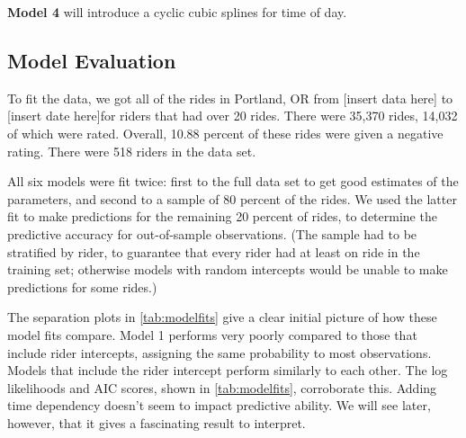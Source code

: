 \documentclass[]{article}
\begin{document}
\textbf{Model 4} will introduce a cyclic cubic splines for time of day.

\subsection{Model Evaluation}\label{model-evaluation}

To fit the data, we got all of the rides in Portland, OR from {[}insert
data here{]} to {[}insert date here{]}for riders that had over 20 rides.
There were 35,370 rides, 14,032 of which were rated. Overall, 10.88
percent of these rides were given a negative rating. There were 518
riders in the data set.

All six models were fit twice: first to the full data set to get good
estimates of the parameters, and second to a sample of 80 percent of the
rides. We used the latter fit to make predictions for the remaining 20
percent of rides, to determine the predictive accuracy for out-of-sample
observations. (The sample had to be stratified by rider, to guarantee
that every rider had at least on ride in the training set; otherwise
models with random intercepts would be unable to make predictions for
some rides.)

The separation plots in \autoref{tab:modelfits} give a clear initial
picture of how these model fits compare. Model 1 performs very poorly
compared to those that include rider intercepts, assigning the same
probability to most observations. Models that include the rider
intercept perform similarly to each other. The log likelihoods and AIC
scores, shown in \autoref{tab:modelfits}, corroborate this. Adding time
dependency doesn't seem to impact predictive ability. We will see later,
however, that it gives a fascinating result to interpret.
\end{document}
